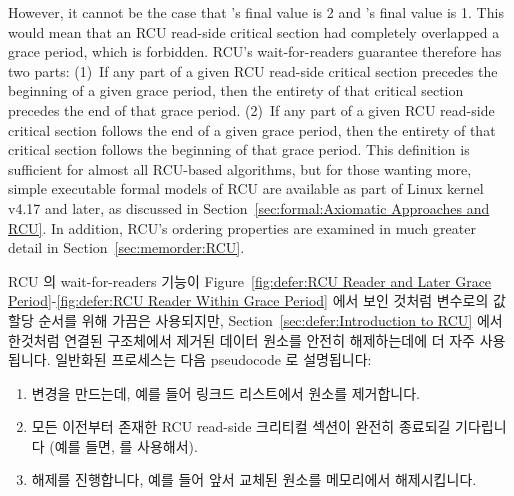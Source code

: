 However, it cannot be the case that 's final value is 2 and 's
final value is 1.
This would mean that an RCU read-side critical section had completely
overlapped a grace period, which is forbidden.
RCU's wait-for-readers guarantee therefore has two parts:
(1)~If any part of a given RCU read-side critical section precedes
the beginning of a given grace period, then the entirety of that
critical section precedes the end of that grace period.
(2)~If any part of a given RCU read-side critical section follows
the end of a given grace period, then the entirety of that
critical section follows the beginning of that grace period.
This definition is sufficient for almost all RCU-based algorithms, but
for those wanting more,
simple executable formal models of RCU are available
as part of Linux kernel v4.17 and later, as discussed in
Section~\ref{sec:formal:Axiomatic Approaches and RCU}.
In addition, RCU's ordering properties are examined in much
greater detail in Section~\ref{sec:memorder:RCU}.
\fi

RCU 의 wait-for-readers 기능이
Figure~\ref{fig:defer:RCU Reader and Later Grace Period}-\ref{fig:defer:RCU Reader Within Grace Period}
에서 보인 것처럼 변수로의 값 할당 순서를 위해 가끔은 사용되지만,
Section~\ref{sec:defer:Introduction to RCU} 에서 한것처럼 연결된 구조체에서
제거된 데이터 원소를 안전히 해제하는데에 더 자주 사용됩니다.
일반화된 프로세스는 다음 pseudocode 로 설명됩니다:

\begin{enumerate}
\item	변경을 만드는데, 예를 들어 링크드 리스트에서 원소를 제거합니다.
\item	모든 이전부터 존재한 RCU read-side 크리티컬 섹션이 완전히 종료되길
	기다립니다 (예를 들면,  를 사용해서).
\item	해제를 진행합니다, 예를 들어 앞서 교체된 원소를 메모리에서
	해제시킵니다.

\end{enumerate}

